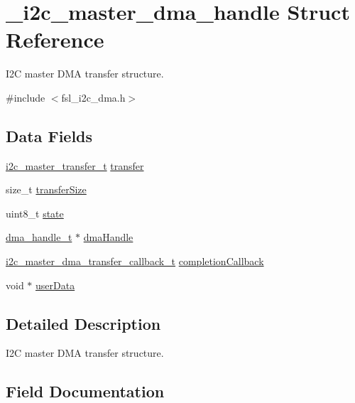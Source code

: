 \hypertarget{struct__i2c__master__dma__handle}{}\section{\+\_\+i2c\+\_\+master\+\_\+dma\+\_\+handle Struct Reference}
\label{struct__i2c__master__dma__handle}


I2C master D\+MA transfer structure.  




{\ttfamily \#include $<$fsl\+\_\+i2c\+\_\+dma.\+h$>$}

\subsection*{Data Fields}
\begin{DoxyCompactItemize}
\item 
\mbox{\hyperlink{group__i2c__driver_ga0e25c3c153992361c8d359a86b70d3c6}{i2c\+\_\+master\+\_\+transfer\+\_\+t}} \mbox{\hyperlink{struct__i2c__master__dma__handle_a9f792796934731101c55954d82000811}{transfer}}
\item 
size\+\_\+t \mbox{\hyperlink{struct__i2c__master__dma__handle_a10e6d1f095e525fa85ffe957081ed7a7}{transfer\+Size}}
\item 
uint8\+\_\+t \mbox{\hyperlink{struct__i2c__master__dma__handle_a0b57aa10271a66f3dc936bba1d2f3830}{state}}
\item 
\mbox{\hyperlink{group__dma_gac4a65788d7e5762d16a41a50b2cd7956}{dma\+\_\+handle\+\_\+t}} $\ast$ \mbox{\hyperlink{struct__i2c__master__dma__handle_a199347e0ec28f8597c9be48b5d0b8fec}{dma\+Handle}}
\item 
\mbox{\hyperlink{group__i2c__dma__driver_gaa04081e50be4d84531d2653c2db6c0f9}{i2c\+\_\+master\+\_\+dma\+\_\+transfer\+\_\+callback\+\_\+t}} \mbox{\hyperlink{struct__i2c__master__dma__handle_a03583428ccdcdc0747543ef2a09fddfe}{completion\+Callback}}
\item 
void $\ast$ \mbox{\hyperlink{struct__i2c__master__dma__handle_a2e294dd14122c554baa0665072b4ca7a}{user\+Data}}
\end{DoxyCompactItemize}


\subsection{Detailed Description}
I2C master D\+MA transfer structure. 

\subsection{Field Documentation}
\mbox{\label{struct__i2c__master__dma__handle_a03583428ccdcdc0747543ef2a09fddfe}} 
